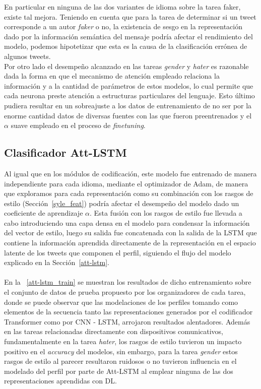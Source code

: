 	En particular en ninguna de las dos variantes de idioma sobre la tarea faker, existe tal mejora. Teniendo en cuenta que para la tarea de determinar si un tweet corresponde a un autor \textit{faker} o no, la existencia de sesgo en la representación dado por la información semántica del mensaje podría afectar el rendimiento del modelo, podemos hipotetizar que esta es la causa de la clasificación errónea de algunos tweets. \\
	Por otro lado el desempeño alcanzado en las tareas \textit{gender} y \textit{hater} es razonable dada la forma en que el mecanismo de atención empleado relaciona la información y a la cantidad de parámetros de estos modelos, lo cual permite que cada neurona  preste atención a estructuras particulares del lenguaje. Esto último pudiera resultar en un sobreajuste a los datos de entrenamiento de no ser por la enorme cantidad datos de diversas fuentes con las que fueron preentrenados y el $\alpha$ suave empleado en el proceso de \textit{finetuning}. 
	
	
	\subsection{Clasificador Att-LSTM}\label{t_attlstm}
	
	Al igual que en los módulos de codificación, este modelo fue entrenado de manera independiente para cada idioma, mediante el optimizador de Adam, de manera que exploramos para cada representación como su combinación con los rasgos de estilo (Sección~\ref{syle_feat}) podría afectar el desempeño del modelo dado un coeficiente de aprendizaje $\alpha$. Esta fusión con los rasgos de estilo fue llevada a cabo introduciendo una capa densa en el modelo para condensar la información del vector de estilo, luego su salida fue concatenada con la salida de la LSTM que contiene la información aprendida directamente de la representación en el espacio latente de los tweets que componen el perfil, siguiendo el flujo del modelo explicado en la Sección~\ref{att-lstm}.
	\\\\
	En la \tablename~\ref{att-lstm_train} se muestran los resultados de dicho entrenamiento sobre el conjunto de datos de prueba propuesto por los organizadores de cada tarea, donde se puede observar que las modelaciones de los perfiles tomando como elementos de la secuencia tanto las representaciones generados por el codificador Transformer como por CNN - LSTM, arrojaron resultados alentadores. Además en las tareas relacionadas directamente con dispositivos comunicativos, fundamentalmente en la tarea \textit{hater}, los rasgos de estilo tuvieron un impacto positivo en el \textit{accuracy} del modelos, sin embargo, para la tarea \textit{gender} estos rasgos de estilo al parecer resultaron ruidosos o no  tuvieron influencia en el modelado del perfil por parte de Att-LSTM al emplear ninguna de las dos representaciones aprendidas con DL.
	
